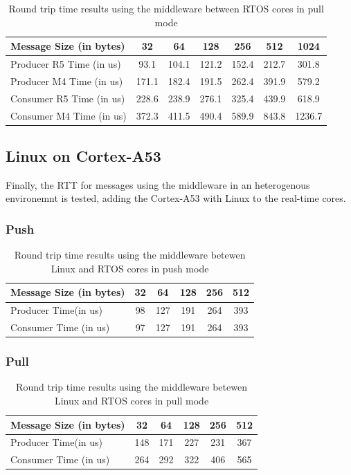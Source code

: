 \begin{table}[H]
\centering
\caption{Round trip time results using the middleware between RTOS cores in
         pull mode}
\label{table:broker_communication_RTOS_cores}
\begin{tabular}{lcccccc}
\toprule
Message Size (in bytes) & 32 & 64 & 128 & 256 & 512 & 1024 \\
\midrule
Producer R5 Time (in us) & 93.1 & 104.1 & 121.2 & 152.4 & 212.7 & 301.8 \\
Producer M4 Time (in us) & 171.1 & 182.4 & 191.5 & 262.4 & 391.9 & 579.2 \\
Consumer R5 Time (in us) & 228.6 & 238.9 & 276.1 & 325.4 & 439.9 & 618.9 \\
Consumer M4 Time (in us) & 372.3 & 411.5 & 490.4 & 589.9 & 843.8 & 1236.7 \\
\bottomrule
\end{tabular}
\end{table}

\subsection{Linux on Cortex-A53}

Finally, the RTT for messages using the middleware in an heterogenous
environemnt is tested, adding the Cortex-A53 with Linux to the real-time cores.

\subsubsection{Push}

\begin{table}[H]
\centering
\caption{Round trip time results using the middleware betewen Linux and RTOS
    cores in push mode}
\label{table:broker_communication_linux_RTOS_cores_push}
\begin{tabular}{lccccc}
\toprule
Message Size (in bytes) & 32 & 64 & 128 & 256 & 512 \\
\midrule
Producer Time(in us) & 98 & 127 & 191 & 264 & 393 \\
Consumer Time (in us) & 97 & 127 & 191 & 264 & 393 \\
\bottomrule
\end{tabular}
\end{table}

\subsubsection{Pull}

\begin{table}[H]
\centering
\caption{Round trip time results using the middleware betewen Linux and RTOS
    cores in pull mode}
\label{table:broker_communication_linux_RTOS_cores_pull}
\begin{tabular}{lccccc}
\toprule
Message Size (in bytes) & 32 & 64 & 128 & 256 & 512 \\
\midrule
Producer Time(in us) & 148 & 171 & 227 & 231 & 367 \\
Consumer Time (in us) & 264 & 292 & 322 & 406 & 565 \\
\bottomrule
\end{tabular}
\end{table}

